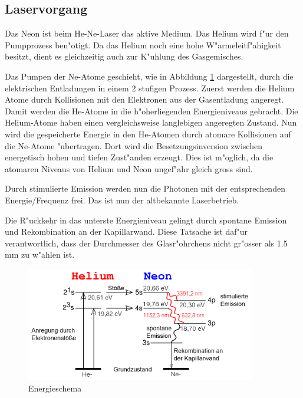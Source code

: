 \begin{refsection}
\subsection{Laservorgang}
Das Neon ist beim He-Ne-Laser das aktive Medium. Das Helium wird f"ur den 
Pumpprozess ben"otigt. 
Da das Helium noch eine hohe W"armeleitf"ahigkeit besitzt, dient es 
gleichzeitig auch zur K"uhlung des Gasgemisches.

Das Pumpen der Ne-Atome geschieht, wie in Abbildung \ref{Energieschema} 
dargestellt, durch die elektrischen Entladungen in einem 2 stufigen Prozess. 
Zuerst werden die Helium Atome durch Kollisionen mit den Elektronen aus der 
Gasentladung angeregt. Damit werden die He-Atome in die h"oherliegenden 
Energieniveaus gebracht.
Die Helium-Atome haben einen vergleichsweise langlebigen angeregten Zustand. 
Nun wird die gespeicherte Energie in den He-Atomen durch atomare Kollisionen 
auf die Ne-Atome "ubertragen. Dort wird die Besetzungsinversion zwischen 
energetisch hohen und tiefen Zust"anden erzeugt. Dies ist m"oglich, da die 
atomaren Niveaus von Helium und Neon ungef"ahr gleich gross sind.

Durch stimulierte Emission werden nun die Photonen mit der entsprechenden 
Energie/Frequenz frei. Das ist nun der altbekannte Laserbetrieb.

Die R"uckkehr in das unterste Energieniveau  gelingt durch spontane Emission 
und Rekombination an der Kapillarwand. Diese Tatsache ist daf"ur 
verantwortlich, dass der Durchmesser des Glasr"ohrchens nicht gr"osser als 1.5 
mm zu w"ahlen ist. 


\begin{figure}
\centering
\includegraphics[width = 10cm]{laser/bilder/Energieschema.png}
\caption{Energieschema}
\label{Energieschema}
\end{figure}

\printbibliography[heading=subbibliography]

\end{refsection}

